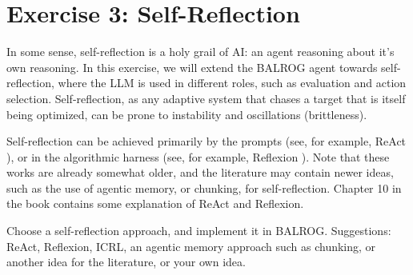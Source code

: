 \documentclass[a4]{article}
\begin{document}
\section{Exercise 3: Self-Reflection}
In some sense, self-reflection is a holy grail of AI: an agent reasoning about it's own reasoning.  %
%
In this exercise, we will extend the BALROG agent towards self-reflection, where the LLM is used in different roles, such as evaluation and action selection. Self-reflection, as any adaptive system that chases a target that is itself being optimized, can be prone to instability and oscillations (brittleness). %

Self-reflection can be achieved primarily by the prompts (see, for example, ReAct \citep{yao2022react}), or in the algorithmic harness (see, for example, Reflexion \citep{shinn2024reflexion}). Note that these works are already somewhat older, and the literature may contain newer ideas, such as the use of agentic memory, or chunking, for self-reflection. 
Chapter 10 in the book contains some explanation of ReAct and Reflexion. 

Choose a self-reflection approach, and implement it in BALROG. Suggestions: ReAct, Reflexion, ICRL, an agentic memory approach such as chunking, or another idea for the literature, or your own idea.  
\end{document}
